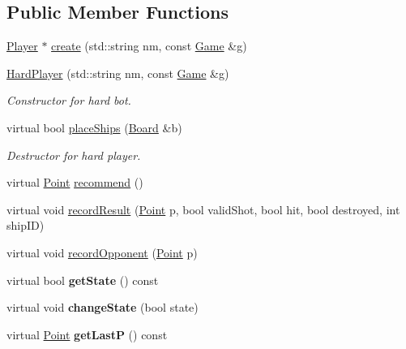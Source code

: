 \subsection*{Public Member Functions}
\begin{DoxyCompactItemize}
\item 
\mbox{\hyperlink{class_player}{Player}} $\ast$ \mbox{\hyperlink{class_hard_player_ab3e76893b9c5163a33ea91b201715a98}{create}} (std\+::string nm, const \mbox{\hyperlink{class_game}{Game}} \&g)
\item 
\mbox{\hyperlink{class_hard_player_a40d564084e88021b21324672bf67b169}{Hard\+Player}} (std\+::string nm, const \mbox{\hyperlink{class_game}{Game}} \&g)
\begin{DoxyCompactList}\small\item\em Constructor for hard bot. \end{DoxyCompactList}\item 
virtual bool \mbox{\hyperlink{class_hard_player_a27d0ad3353eba585d7a93d2092036f98}{place\+Ships}} (\mbox{\hyperlink{class_board}{Board}} \&b)
\begin{DoxyCompactList}\small\item\em Destructor for hard player. \end{DoxyCompactList}\item 
virtual \mbox{\hyperlink{class_point}{Point}} \mbox{\hyperlink{class_hard_player_ae1d21325a648a88f1bf51f2b0b286190}{recommend}} ()
\item 
virtual void \mbox{\hyperlink{class_hard_player_aa8977ca3294daf996707bd0ff434d69e}{record\+Result}} (\mbox{\hyperlink{class_point}{Point}} p, bool valid\+Shot, bool hit, bool destroyed, int ship\+ID)
\item 
virtual void \mbox{\hyperlink{class_hard_player_a986175fb966099ac5fe39950e18799ae}{record\+Opponent}} (\mbox{\hyperlink{class_point}{Point}} p)
\item 
\mbox{\label{class_hard_player_a063d9f4071b687339fbc134239771ef3}} 
virtual bool {\bfseries get\+State} () const
\item 
\mbox{\label{class_hard_player_aa25afded558192bd39d8d2c1b2a8209a}} 
virtual void {\bfseries change\+State} (bool state)
\item 
\mbox{\label{class_hard_player_ad86f7d42434ae5526d7a1ca4ea65b51a}} 
virtual \mbox{\hyperlink{class_point}{Point}} {\bfseries get\+LastP} () const

\end{DoxyCompactItemize}
